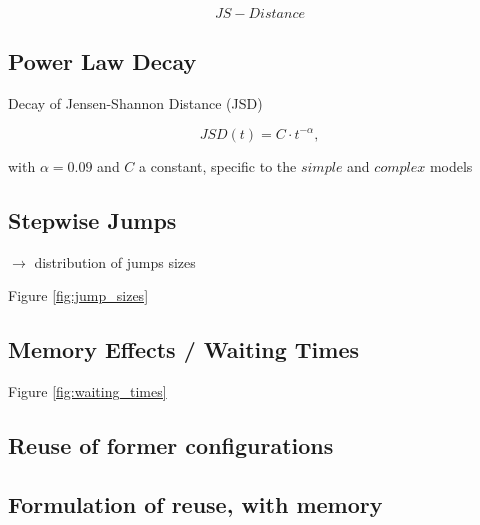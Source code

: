 \begin{equation}
\label{JS-distance}
JS-Distance
\end{equation}

\subsection{Power Law Decay}

Decay  of Jensen-Shannon Distance (JSD) 

\begin{equation}
\label{power_law_decay}
JSD(t) = C \cdot t^{-\alpha},
\end{equation}

with $\alpha = 0.09$ and $C$ a constant, specific to the $simple$ and $complex$ models

 
\subsection{Stepwise Jumps}

$\rightarrow$ distribution of jumps sizes

Figure \ref{fig:jump_sizes}



\subsection{Memory Effects / Waiting Times}

Figure \ref{fig:waiting_times}


\subsection{Reuse of former configurations}



\subsection{Formulation of reuse, with memory}

